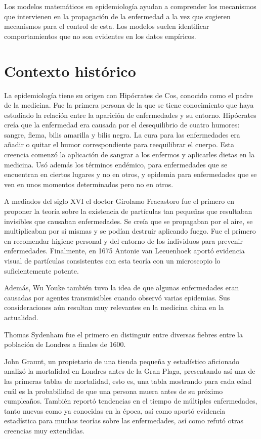 Los modelos matemáticos en epidemiología ayudan a comprender los mecanismos que intervienen en la propagación de la enfermedad a la vez que sugieren mecanismos para el control de esta. Los modelos suelen identificar comportamientos que no son evidentes en los datos empíricos.


\section{Contexto histórico}

La epidemiología tiene su origen con Hipócrates de Cos, conocido como el padre de la medicina. Fue la primera persona de la que se tiene conocimiento que haya estudiado la relación entre la aparición de enfermedades y su entorno. Hipócrates creía que la enfermedad era causada por el desequilibrio de cuatro humores: sangre, flema, bilis amarilla y bilis negra. La cura para las enfermedades era añadir o quitar el humor correspondiente para reequilibrar el cuerpo. Esta creencia comenzó la aplicación de sangrar a los enfermos y aplicarles dietas en la medicina. Usó además los términos endémico, para enfermedades que se encuentran en ciertos lugares y no en otros, y epidemia para enfermedades que se ven en unos momentos determinados pero no en otros.

A mediados del siglo XVI el doctor Girolamo Fracastoro fue el primero en proponer la teoría sobre la existencia de partículas tan pequeñas que resultaban invisibles que causaban enfermedades. Se creía que se propagaban por el aire, se multiplicaban por sí mismas y se podían destruir aplicando fuego. Fue el primero en recomendar higiene personal y del entorno de los individuos para prevenir enfermedades. Finalmente, en 1675 Antonie van Leeuenhoek aportó evidencia visual de partículas consistentes con esta teoría con un microscopio lo suficientemente potente.

Además, Wu Youke también tuvo la idea de que algunas enfermedades eran causadas por agentes transmisibles cuando observó varias epidemias. Sus consideraciones aún resultan muy relevantes en la medicina china en la actualidad.

Thomas Sydenham fue el primero en distinguir entre diversas fiebres entre la población de Londres a finales de 1600.

John Graunt, un propietario de una tienda pequeña y estadístico aficionado analizó la mortalidad en Londres antes de la Gran Plaga, presentando así una de las primeras tablas de mortalidad, esto es, una tabla mostrando para cada edad cuál es la probabilidad de que una persona muera antes de su próximo cumpleaños. También reportó tendencias en el tiempo de múltiples enfermedades, tanto nuevas como ya conocidas en la época, así como aportó evidencia estadística para muchas teorías sobre las enfermedades, así como refutó otras creencias muy extendidas.

